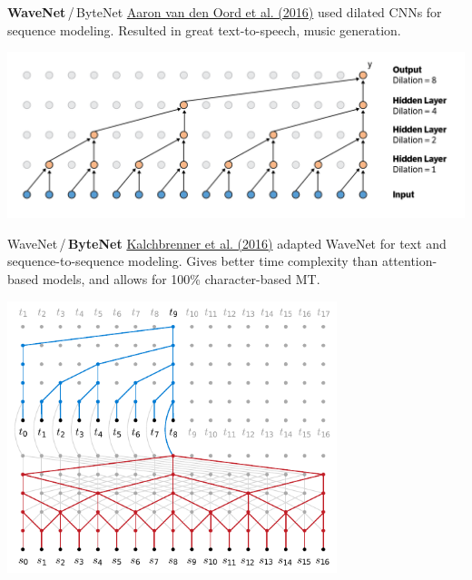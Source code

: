 \documentclass[xcolor=pdftex,x11names,table,hyperref]{beamer}
\begin{document}
\begin{frame}{\textbf{WaveNet}\,/\,ByteNet}
	\href{https://arxiv.org/abs/1609.03499}{Aaron van den Oord et al. (2016)} used dilated CNNs for sequence modeling. Resulted in great text-to-speech, music generation. \\
	\begin{center}
	\includegraphics[width=1.02\textwidth]{images/wavenet.png}
	\end{center}
\end{frame}

\begin{frame}{WaveNet\,/\,\textbf{ByteNet}}
	\href{https://arxiv.org/abs/1610.10099}{Kalchbrenner et al. (2016)} adapted WaveNet for text and sequence-to-sequence modeling. Gives better time complexity than attention-based models, and allows for 100\% character-based MT. \\
	\begin{center}
	\includegraphics[width=0.72\textwidth]{images/bytenet.pdf}
	\end{center}
\end{frame}
\end{document}
